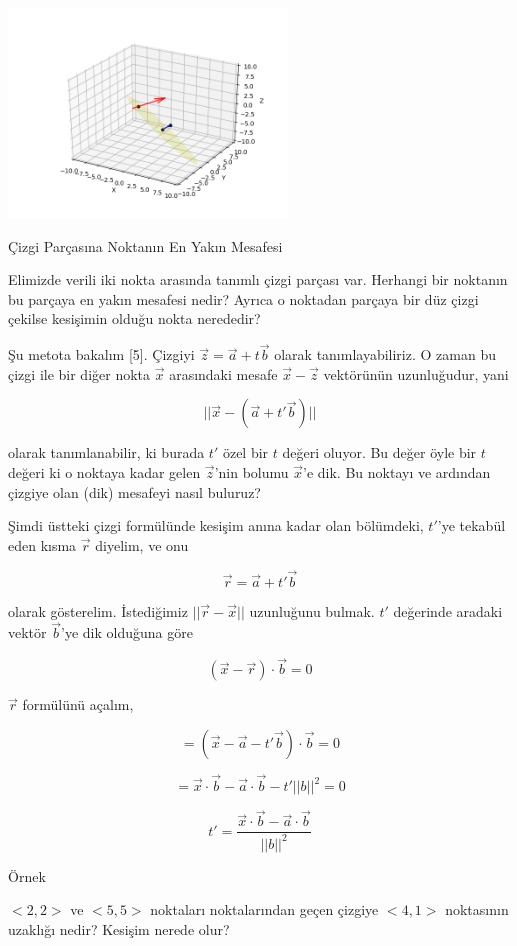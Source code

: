 \documentclass[12pt,fleqn]{article}\usepackage{../../common}
\begin{document}
\includegraphics[width=20em]{5_10.png}

Çizgi Parçasına Noktanın En Yakın Mesafesi

Elimizde verili iki nokta arasında tanımlı çizgi parçası var. Herhangi bir
noktanın bu parçaya en yakın mesafesi nedir? Ayrıca o noktadan parçaya bir düz
çizgi çekilse kesişimin olduğu nokta nerededir?

Şu metota bakalım [5]. Çizgiyi $\vec{z} = \vec{a} + t \vec{b}$ olarak
tanımlayabiliriz. O zaman bu çizgi ile bir diğer nokta $\vec{x}$ arasındaki
mesafe $\vec{x}-\vec{z}$ vektörünün uzunluğudur, yani

$$
|| \vec{x} - (\vec{a} + t' \vec{b}) ||
$$

olarak tanımlanabilir, ki burada $t'$ özel bir $t$ değeri oluyor. Bu değer öyle
bir $t$ değeri ki o noktaya kadar gelen $\vec{z}$'nin bolumu $\vec{x}$'e dik. Bu
noktayı ve ardından çizgiye olan (dik) mesafeyi nasıl buluruz?

Şimdi üstteki çizgi formülünde kesişim anına kadar olan bölümdeki, $t'$'ye
tekabül eden kısma $\vec{r}$ diyelim, ve onu

$$
\vec{r} = \vec{a} + t' \vec{b}
$$

olarak gösterelim. İstediğimiz $||\vec{r}-\vec{x}||$ uzunluğunu bulmak. $t'$
değerinde aradaki vektör $\vec{b}$'ye dik olduğuna göre

$$
(\vec{x} - \vec{r}) \cdot \vec{b} = 0
$$

$\vec{r}$ formülünü açalım,

$$
= (\vec{x} - \vec{a} - t' \vec{b}) \cdot \vec{b} = 0
$$

$$
= \vec{x}\cdot\vec{b} - \vec{a}\cdot\vec{b} - t'||b||^2 = 0
$$

$$
t' = \frac{\vec{x}\cdot\vec{b} - \vec{a}\cdot\vec{b}}{||b||^2}
$$

Örnek

$< 2,2 >$ ve $< 5,5 >$ noktaları noktalarından geçen çizgiye $< 4,1 >$ noktasının
uzaklığı nedir? Kesişim nerede olur?
\end{document}
